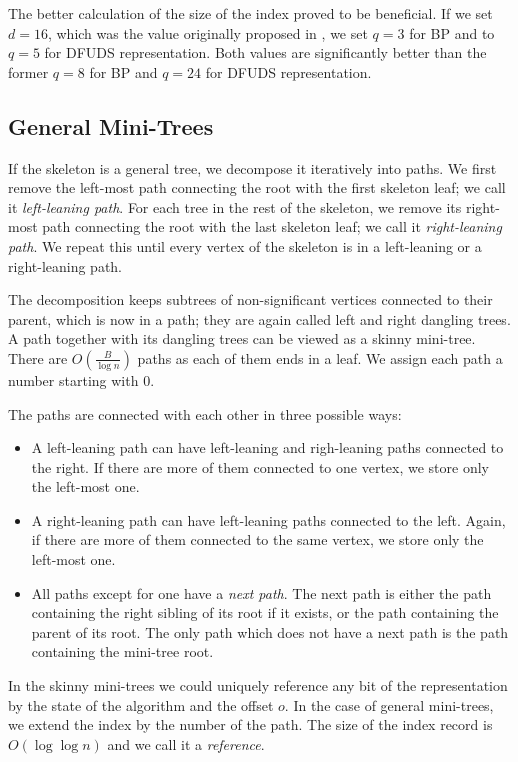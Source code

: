The better calculation of the size of the index proved to be beneficial.
If we set $d = 16$, which was the value originally proposed in \cite{farzan2009universal}, we set $q = 3$ for BP and to $q = 5$ for DFUDS representation.
Both values are significantly better than the former $q = 8$ for BP and $q = 24$ for DFUDS representation.

\subsection{General Mini-Trees}

If the skeleton is a general tree, we decompose it iteratively into paths.
We first remove the left-most path connecting the root with the first skeleton leaf; we call it \emph{left-leaning path}.
For each tree in the rest of the skeleton, we remove its right-most path connecting the root with the last skeleton leaf; we call it \emph{right-leaning path}.
We repeat this until every vertex of the skeleton is in a left-leaning or a right-leaning path.

The decomposition keeps subtrees of non-significant vertices connected to their parent, which is now in a path; they are again called left and right dangling trees.
A path together with its dangling trees can be viewed as a skinny mini-tree.
There are $O(\frac{B}{\log n})$ paths as each of them ends in a leaf.
We assign each path a number starting with $0$.

The paths are connected with each other in three possible ways:
\begin{itemize}
	\item A left-leaning path can have left-leaning and righ-leaning paths connected to the right.
	If there are more of them connected to one vertex, we store only the left-most one.
	
	\item A right-leaning path can have left-leaning paths connected to the left.
	Again, if there are more of them connected to the same vertex, we store only the left-most one.
	
	\item All paths except for one have a \emph{next path}.
	The next path is either the path containing the right sibling of its root if it exists, or the path containing the parent of its root.
	The only path which does not have a next path is the path containing the mini-tree root.
\end{itemize}

In the skinny mini-trees we could uniquely reference any bit of the representation by the state of the algorithm and the offset $o$.
In the case of general mini-trees, we extend the index by the number of the path.
The size of the index record is $O(\log \log n)$ and we call it a \emph{reference}.

